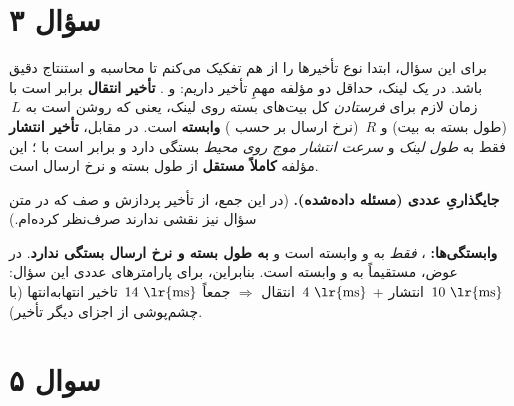 \section{سؤال ۳}
برای این سؤال، ابتدا نوع تأخیرها را از هم تفکیک می‌کنم تا محاسبه و استنتاج دقیق باشد. در یک لینک، حداقل دو مؤلفه مهمِ تأخیر داریم:  و . \textbf{تأخیر انتقال} برابر است با زمان لازم برای \emph{فرستادن} کل بیت‌های بسته روی لینک، یعنی  که روشن است به \(\,L\) (طول بسته به بیت) و \(\,R\) (نرخ ارسال بر حسب ) \textbf{وابسته} است. در مقابل، \textbf{تأخیر انتشار} فقط به \emph{طول لینک} و \emph{سرعت انتشار موج روی محیط} بستگی دارد و برابر است با ؛ این مؤلفه \textbf{کاملاً مستقل} از طول بسته و نرخ ارسال است.

\medskip
\noindent\textbf{جایگذاریِ عددی (مسئله داده‌شده).}
\lr{
\[
\begin{aligned}
&L=1000~\text{bytes}=8000~\text{bits},\qquad
d=2500~\text{km}=2.5\times 10^{6}~\text{m},\\
&s=2.5\times 10^{8}~\frac{\text{m}}{\text{s}},\qquad
R=2\times 10^{6}~\frac{\text{bits}}{\text{s}} \;.
\end{aligned}
\]
\[
d_{\text{prop}}=\frac{d}{s}=\frac{2.5\times 10^{6}}{2.5\times 10^{8}}=0.01~\text{s}=10~\text{ms},
\qquad
d_{\text{trans}}=\frac{L}{R}=\frac{8000}{2\times 10^{6}}=0.004~\text{s}=4~\text{ms}.
\]
\[
\boxed{~d_{\text{total}}=d_{\text{trans}}+d_{\text{prop}}=4~\text{ms}+10~\text{ms}=14~\text{ms}~}
\]
}
(در این جمع، از تأخیر پردازش و صف که در متن سؤال نیز نقشی ندارند صرف‌نظر کرده‌ام.)

\lr{
\[
\boxed{~d_{\text{trans}}=\frac{L}{R},\qquad d_{\text{prop}}=\frac{d}{s},\qquad d_{\text{total}}=\frac{L}{R}+\frac{d}{s}~}
\]
}
\textbf{وابستگی‌ها:} ،  \emph{فقط} به  و  وابسته است و \textbf{به طول بسته و نرخ ارسال بستگی ندارد}. در عوض،  مستقیماً به  و  وابسته است. بنابراین، برای پارامترهای عددی این سؤال: \(\,10~\text{\lr{ms}}\) انتشار + \(\,4~\text{\lr{ms}}\) انتقال \(\Rightarrow\) جمعاً \(\,14~\text{\lr{ms}}\) تاخیر انتها‌به‌انتها (با چشم‌پوشی از اجزای دیگر تأخیر).


\section{سوال ۵}

